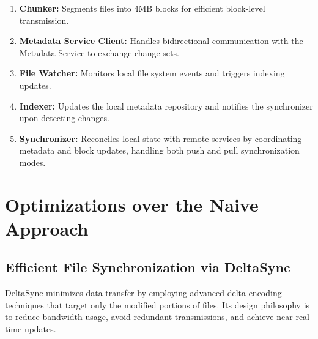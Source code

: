 \begin{enumerate}
    \item \textbf{Chunker:} Segments files into 4MB blocks for efficient block-level transmission.
    \item \textbf{Metadata Service Client:} Handles bidirectional communication with the Metadata Service to exchange change sets.
    \item \textbf{File Watcher:} Monitors local file system events and triggers indexing updates.
    \item \textbf{Indexer:} Updates the local metadata repository and notifies the synchronizer upon detecting changes.
    \item \textbf{Synchronizer:} Reconciles local state with remote services by coordinating metadata and block updates, handling both push and pull synchronization modes.
\end{enumerate}


\section{Optimizations over the Naive Approach}

\subsection{Efficient File Synchronization via DeltaSync}

DeltaSync minimizes data transfer by employing advanced delta encoding techniques that target only the modified portions of files. Its design philosophy is to reduce bandwidth usage, avoid redundant transmissions, and achieve near-real-time updates.

